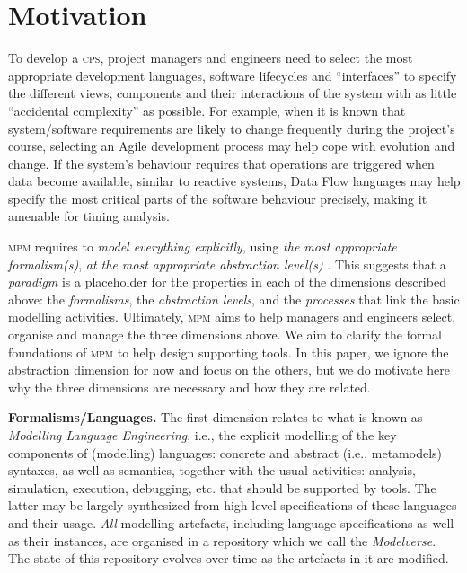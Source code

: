 \section{Motivation}
\label{sec:Motivation}

To develop a \textsc{cps}, project managers and engineers need to select the most 
appropriate development languages, software lifecycles and ``interfaces'' to 
specify the different views, components and their interactions of the system 
with as little ``accidental complexity''  \cite{BrooksSilverBullet} as possible. 
For example, when it is known that system/software 
requirements are likely to change frequently during the project's course, 
selecting an Agile development process may help cope with evolution and 
change. If the system's behaviour requires that operations are triggered when 
data become available, similar to reactive systems, Data Flow 
languages may help specify the most critical parts of the software behaviour precisely, 
making it amenable for timing analysis. 

\textsc{mpm} requires to \emph{model everything explicitly}, using \emph{the 
most appropriate formalism(s)}, \emph{at the most appropriate abstraction level(s)} 
\cite{PhD:VanTandeloo:2017}. This suggests that a \emph{paradigm} is a 
placeholder for the properties in each of the dimensions described 
above: the \emph{formalisms}, the \emph{abstraction levels}, and the 
\emph{processes} that link the basic modelling activities. 
Ultimately, \textsc{mpm} aims to help managers and engineers select, organise and manage the 
three dimensions above. We aim to clarify the formal foundations of 
\textsc{mpm} to help design supporting tools. In this paper, we ignore the abstraction dimension 
for now and focus on the others, but we do motivate here why the three dimensions are necessary and 
how they are related.

\noindent
\textbf{Formalisms/Languages.} The first dimension relates to what is  
known as \emph{Modelling Language Engineering}, i.e., the explicit modelling of 
the key components of (modelling) languages: concrete and abstract (i.e., 
metamodels) syntaxes, as well as semantics, together with the usual activities: 
analysis, simulation, execution, debugging, etc. that should be 
supported by tools. The latter may be largely synthesized from high-level 
specifications of these languages and their usage. \emph{All} modelling artefacts, including 
language specifications as well as their instances, are 
organised in a repository which we call the \emph{Modelverse}.
The state of this repository evolves over time as the artefacts in it are modified.

